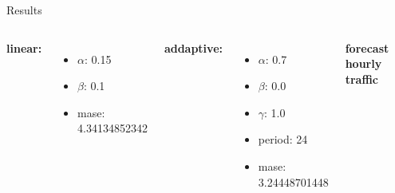 \documentclass{beamer}
\begin{document}
  \begin{frame}{Results}
    \begin{columns}[c]
      \textbf{linear:}
      \begin{itemize}
	\item $\alpha$: 0.15
	\item $\beta$: 0.1
	\item mase: 4.34134852342
      \end{itemize}
      
      \textbf{addaptive:}
      \begin{itemize}
	\item $\alpha$: 0.7 
	\item $\beta$: 0.0
	\item $\gamma$: 1.0
	\item period: 24
	\item mase: 3.24448701448
      \end{itemize}
    
      \textbf{forecast hourly traffic}
      \begin{figure}
	\includegraphics[width=1.1\textwidth]{images/hoursly.png}
      \end{figure}
    \end{columns}
  \end{frame}
  
\end{document}
